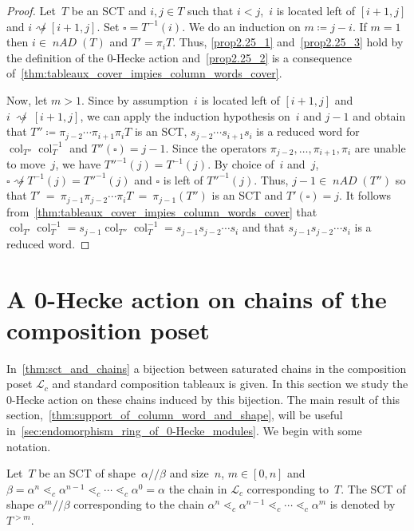 \documentclass[ALCO,ThmDefs,Unicode,epreuves]{cedram}
\newcommand{\mc}[1]{\mathcal{#1} }
\newcommand{\nAD}{\operatorname{\mathit{nAD}}}
\newcommand{\fs}{s}
\newcommand{\col}{\operatorname{col}}
\newcommand{\skc}{/ \! \! / }
\newcommand{\ab}{{\alpha / \! \! / \beta}}
\newcommand{\natt}{\not \rightsquigarrow}
\newcommand{\cell}{\square}
\begin{document}
\begin{proof}
	Let~$T$ be an SCT and $i,j\in T$ such that $i<j$,~$i$ is located left of $[i+1,j]$
	and $i \natt[i+1,j]$. Set $\cell = T^{-1}(i)$.
	We do an induction on $m\coloneqq j-i$. If $m=1$ then $i\in \nAD(T)$ and $T' = \pi_i T$. Thus, 	\eqref{prop2.25_1} and~\eqref{prop2.25_3} hold by the definition of the 0-Hecke action and~\eqref{prop2.25_2} is a consequence of~\cref{thm:tableaux_cover_impies_column_words_cover}.
	
	Now, let $m>1$. Since by assumption~$i$ is located left of $[i+1,j]$
	and $i~\natt~[i+1,j]$, we can apply the induction hypothesis on~$i$ and $j-1$ and obtain that $T''\coloneqq \pi_{j-2} \cdots \pi_{i+1}\pi_i T$ is an SCT, $\fs_{j-2} \cdots \fs_{i+1}\fs_i$ is a reduced word for $\col_{T''}\col_T^{-1}$ and $T''(\cell) = j-1$.
	Since the operators $\pi_{j-2}, \ldots, \pi_{i+1}, \pi_{i}$ are unable to move~$j$, we have $T''^{-1}(j) = T^{-1}(j).$
	By choice of~$i$ and~$j$, $\cell \natt T^{-1}(j) = T''^{-1}(j)$ and $\cell$ is left of $T''^{-1}(j)$.
	Thus, $j-1\in \nAD(T'')$ so that $T'~=~\pi_{j-1} \pi_{j-2}\cdots \pi_i T~=~\pi_{j-1}(T'')$ is an SCT and $T'(\cell) = j$.
	It follows from~\cref{thm:tableaux_cover_impies_column_words_cover} that $\col_{T'}\col_T^{-1}=s_{j-1}\col_{T''}\col^{-1}_{T}= \fs_{j-1}\fs_{j-2} \cdots \fs_i$ and that $\fs_{j-1}\fs_{j-2} \cdots \fs_i$ is a reduced word.
\end{proof}


\section{A 0-Hecke action on chains of the composition poset}

\label{sec:0-hecke_operation_and_chains}

In~\cref{thm:sct_and_chains} a bijection between saturated chains in the composition poset $\mc L_c$ and standard composition tableaux is given. 
In this section we study the 0-Hecke action on these chains induced by this bijection. The main result of this section,~\cref{thm:support_of_column_word_and_shape}, will be useful in~\cref{sec:endomorphism_ring_of_0-Hecke_modules}. We begin with some notation.

\begin{defi}
	\label{thm:parts_of_chains_in_L_c}
	Let~$T$ be an SCT of shape~$\ab$ and size~$n$, $m\in [0,n]$ and ${\beta = \alpha^n \lessdot_c \alpha^{n-1} \lessdot_c \cdots \lessdot_c \alpha^0 =\alpha}$ the chain in $\mathcal L_c$ corresponding to~$T$. 
	 The SCT of shape $\alpha^m \skc \beta$ corresponding to the chain $\alpha^n \lessdot_c \alpha^{n-1}\lessdot_c \cdots \lessdot_c \alpha^m$ is denoted by $T^{>m}$.
\end{defi}
\end{document}
